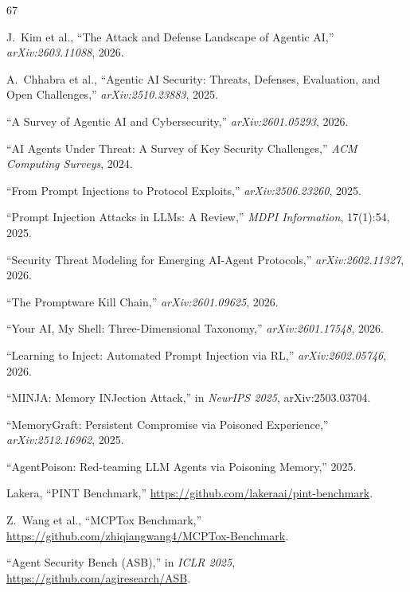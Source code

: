 \documentclass[11pt,letterpaper]{article}
\begin{document}
\begin{thebibliography}{67}

J.~Kim et al., ``The Attack and Defense Landscape of Agentic AI,'' \textit{arXiv:2603.11088}, 2026.

A.~Chhabra et al., ``Agentic AI Security: Threats, Defenses, Evaluation, and Open Challenges,'' \textit{arXiv:2510.23883}, 2025.

``A Survey of Agentic AI and Cybersecurity,'' \textit{arXiv:2601.05293}, 2026.

``AI Agents Under Threat: A Survey of Key Security Challenges,'' \textit{ACM Computing Surveys}, 2024.

``From Prompt Injections to Protocol Exploits,'' \textit{arXiv:2506.23260}, 2025.

``Prompt Injection Attacks in LLMs: A Review,'' \textit{MDPI Information}, 17(1):54, 2025.

``Security Threat Modeling for Emerging AI-Agent Protocols,'' \textit{arXiv:2602.11327}, 2026.

``The Promptware Kill Chain,'' \textit{arXiv:2601.09625}, 2026.

``Your AI, My Shell: Three-Dimensional Taxonomy,'' \textit{arXiv:2601.17548}, 2026.

``Learning to Inject: Automated Prompt Injection via RL,'' \textit{arXiv:2602.05746}, 2026.

``MINJA: Memory INJection Attack,'' in \textit{NeurIPS 2025}, arXiv:2503.03704.

``MemoryGraft: Persistent Compromise via Poisoned Experience,'' \textit{arXiv:2512.16962}, 2025.

``AgentPoison: Red-teaming LLM Agents via Poisoning Memory,'' 2025.

Lakera, ``PINT Benchmark,'' \url{https://github.com/lakeraai/pint-benchmark}.

Z.~Wang et al., ``MCPTox Benchmark,'' \url{https://github.com/zhiqiangwang4/MCPTox-Benchmark}.

``Agent Security Bench (ASB),'' in \textit{ICLR 2025}, \url{https://github.com/agiresearch/ASB}.


\end{thebibliography}
\end{document}
